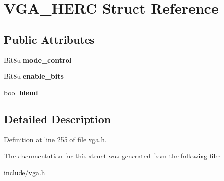 \hypertarget{structVGA__HERC}{\section{V\-G\-A\-\_\-\-H\-E\-R\-C Struct Reference}
\label{structVGA__HERC}
}
\subsection*{Public Attributes}
\begin{DoxyCompactItemize}
\item 
\hypertarget{structVGA__HERC_ab6ac3f557c940847cfadec99c7f71c74}{Bit8u {\bfseries mode\-\_\-control}}\label{structVGA__HERC_ab6ac3f557c940847cfadec99c7f71c74}

\item 
\hypertarget{structVGA__HERC_a3583e1934895677bfdf4cd907b81c479}{Bit8u {\bfseries enable\-\_\-bits}}\label{structVGA__HERC_a3583e1934895677bfdf4cd907b81c479}

\item 
\hypertarget{structVGA__HERC_af5435dbc6b4458a9565c18d05741f979}{bool {\bfseries blend}}\label{structVGA__HERC_af5435dbc6b4458a9565c18d05741f979}

\end{DoxyCompactItemize}


\subsection{Detailed Description}


Definition at line 255 of file vga.\-h.



The documentation for this struct was generated from the following file\-:\begin{DoxyCompactItemize}
\item 
include/vga.\-h\end{DoxyCompactItemize}
